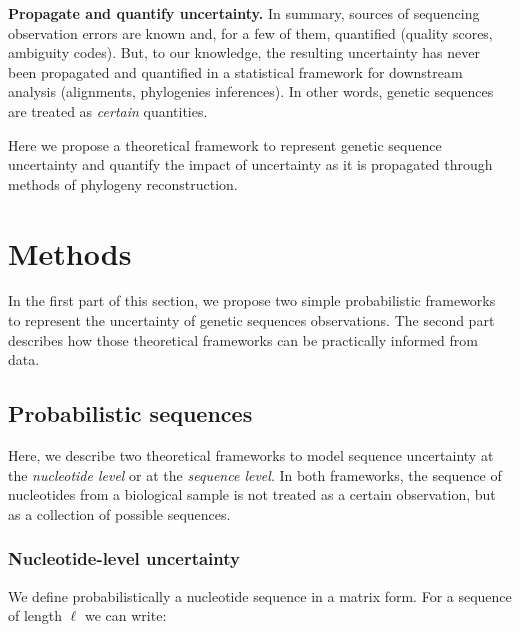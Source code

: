 \documentclass[10pt]{article}
\begin{document}
\textbf{Propagate and quantify uncertainty.}
In summary, sources of sequencing observation errors are known and, for a few of them, quantified (quality scores, ambiguity codes).
But, to our knowledge, the resulting uncertainty has never been propagated and quantified in a statistical framework for downstream analysis (\eg alignments,  phylogenies inferences).
In other words, genetic sequences are treated as \emph{certain} quantities.

\vspace*{1ex}

Here we propose a theoretical framework to represent genetic sequence uncertainty and quantify the impact of uncertainty as it is propagated through methods of phylogeny reconstruction. 





\newpage

\section{Methods}


In the first part of this section, we propose two simple probabilistic frameworks to represent the uncertainty of genetic sequences observations.
The second part describes how those theoretical frameworks can be practically informed from data.


\subsection{Probabilistic sequences}

Here, we describe two theoretical frameworks to model sequence uncertainty at the \emph{nucleotide level} or at the \emph{sequence level}.
In both frameworks, the sequence of nucleotides from a biological sample is not treated as a certain observation, but as a collection of possible sequences.


\subsubsection{Nucleotide-level uncertainty}
 
We define probabilistically a nucleotide sequence in a matrix form. For a sequence of length $\ell$ we can write:
\end{document}
